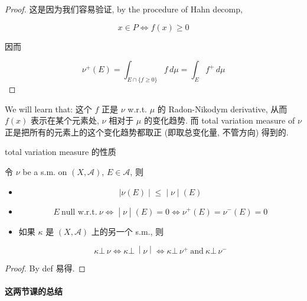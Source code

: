 \documentclass{qlnotes-export}
\begin{document}
\begin{proof}

这是因为我们容易验证, by the procedure of Hahn decomp,

\[x \in P\Leftrightarrow f(x) \geq 0\]

因而

\[\nu^{+}(E) = \int_{E \cap {\{{f \geq 0}\}}}f\, d\mu = \int_{E}f^{+}\, d\mu\]

\end{proof}

We will learn that: 这个 \(f\) 正是 \(\nu\) w.r.t. \(\mu\) 的 Radon-Nikodym derivative, 从而 \(f(x)\) 表示在某个元素处, \(\nu\) 相对于 \(\mu\) 的变化趋势. 而 total variation measure of \(\nu\) 正是把所有的元素上的这个变化趋势都取正 (即取总变化量, 不管方向) 得到的.

\begin{lemma}{total variation measure 的性质}\label{lem-10-signed-measure-jordan-decomposition-total-variation-measure}

令 \(\nu\) be a s.m. on \((X,\mathcal{A})\), \(E \in \mathcal{A}\), 则

\begin{itemize}
\item
  \[\left. |\nu(E) \middle| \leq \middle| \nu \middle| (E) \right.\]
\item
  \[\left. E\ \text{null w.r.t.}\ \nu\Leftrightarrow \middle| \nu \middle| (E) = 0\Leftrightarrow\nu^{+}(E) = \nu^{-}(E) = 0 \right.\]
\item
  如果 \(\kappa\) 是 \((X,\mathcal{A})\) 上的另一个 s.m., 则

  \[\left. \kappa\bot\,\nu\Leftrightarrow\kappa\bot\, \middle| \nu \middle| \Leftrightarrow\kappa\bot\,\nu^{+}\ \text{and}\ \kappa\bot\,\nu^{-} \right.\]
\end{itemize}

\end{lemma}

\begin{proof}

By def 易得.

\end{proof}

\paragraph{这两节课的总结}\label{ux8fd9ux4e24ux8282ux8bfeux7684ux603bux7ed3}
\end{document}
